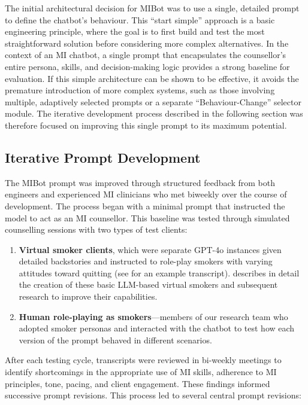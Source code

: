 The initial architectural decision for MIBot was to use a single, detailed prompt to define the chatbot's behaviour. This ``start simple'' approach is a basic engineering principle, where the goal is to first build and test the most straightforward solution before considering more complex alternatives. In the context of an MI chatbot, a single prompt that encapsulates the counsellor's entire persona, skills, and decision-making logic provides a strong baseline for evaluation. If this simple architecture can be shown to be effective, it avoids the premature introduction of more complex systems, such as those involving multiple, adaptively selected prompts or a separate ``Behaviour-Change'' selector module. The iterative development process described in the following section was therefore focused on improving this single prompt to its maximum potential.

\subsection{Iterative Prompt Development}
The MIBot prompt was improved through structured feedback from both engineers and experienced MI clinicians who met biweekly over the course of development. The process began with a minimal prompt that instructed the model to act as an MI counsellor. This baseline was tested through simulated counselling sessions with two types of test clients:

\begin{enumerate}
	\item \textbf{Virtual smoker clients}, which were separate GPT-4o instances given detailed backstories and instructed to role-play smokers with varying attitudes toward quitting (see  for an example transcript).  describes in detail the creation of these basic LLM-based virtual smokers and subsequent research to improve their capabilities.
	\item \textbf{Human role-playing as smokers}---members of our research team who adopted smoker personas and interacted with the chatbot to test how each version of the prompt behaved in different scenarios.
\end{enumerate}

After each testing cycle, transcripts were reviewed in bi-weekly meetings to identify shortcomings in the appropriate use of MI skills, adherence to MI principles, tone, pacing, and client engagement. These findings informed successive prompt revisions.
This process led to several central prompt revisions:


